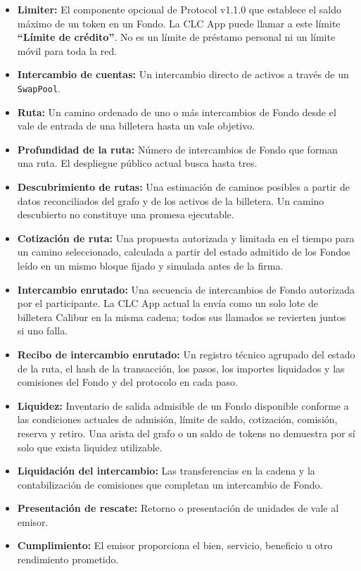 \documentclass[11pt]{article}
\begin{document}
\begin{itemize}[leftmargin=*]
\item \textbf{Limiter:} El componente opcional de Protocol v1.1.0 que establece el saldo máximo de un token en un Fondo. La CLC App puede llamar a este límite \textbf{``Límite de crédito''}. No es un límite de préstamo personal ni un límite móvil para toda la red.
\item \textbf{Intercambio de cuentas:} Un intercambio directo de activos a través de un \texttt{SwapPool}.
\item \textbf{Ruta:} Un camino ordenado de uno o más intercambios de Fondo desde el vale de entrada de una billetera hasta un vale objetivo.
\item \textbf{Profundidad de la ruta:} Número de intercambios de Fondo que forman una ruta. El despliegue público actual busca hasta tres.
\item \textbf{Descubrimiento de rutas:} Una estimación de caminos posibles a partir de datos reconciliados del grafo y de los activos de la billetera. Un camino descubierto no constituye una promesa ejecutable.
\item \textbf{Cotización de ruta:} Una propuesta autorizada y limitada en el tiempo para un camino seleccionado, calculada a partir del estado admitido de los Fondos leído en un mismo bloque fijado y simulada antes de la firma.
\item \textbf{Intercambio enrutado:} Una secuencia de intercambios de Fondo autorizada por el participante. La CLC App actual la envía como un solo lote de billetera Calibur en la misma cadena; todos sus llamados se revierten juntos si uno falla.
\item \textbf{Recibo de intercambio enrutado:} Un registro técnico agrupado del estado de la ruta, el hash de la transacción, los pasos, los importes liquidados y las comisiones del Fondo y del protocolo en cada paso.
\item \textbf{Liquidez:} Inventario de salida admisible de un Fondo disponible conforme a las condiciones actuales de admisión, límite de saldo, cotización, comisión, reserva y retiro. Una arista del grafo o un saldo de tokens no demuestra por sí solo que exista liquidez utilizable.
\item \textbf{Liquidación del intercambio:} Las transferencias en la cadena y la contabilización de comisiones que completan un intercambio de Fondo.
\item \textbf{Presentación de rescate:} Retorno o presentación de unidades de vale al emisor.
\item \textbf{Cumplimiento:} El emisor proporciona el bien, servicio, beneficio u otro rendimiento prometido.

\end{itemize}
\end{document}
